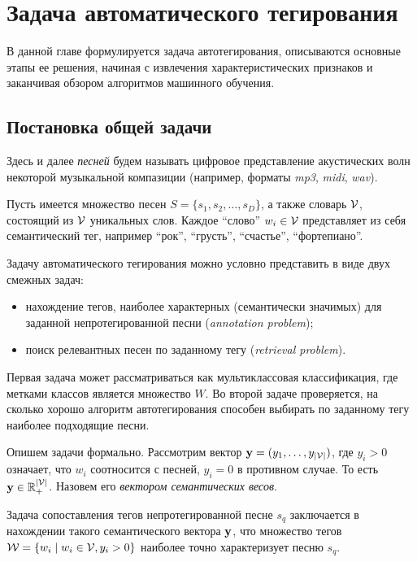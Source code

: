 \chapter{Задача автоматического тегирования}
\label{chapter1}

В данной главе формулируется задача автотегирования, описываются основные этапы ее решения, 
начиная с извлечения характеристических признаков и заканчивая обзором алгоритмов машинного обучения.

\section{Постановка общей задачи}
Здесь и далее \emph{песней} будем называть цифровое представление акустических волн некоторой музыкальной компазиции (например, форматы \emph{mp3}, \emph{midi}, \emph{wav}).

Пусть имеется множество песен $S = \{s_1, s_2, \ldots, s_D \}$, а также словарь $ \mathcal{V} $, состоящий из $ \mathcal{V} $ уникальных слов. 
Каждое ``слово'' $w_i \in \mathcal{V}$ представляет из себя семантический тег, например ``рок'', ``грусть'', ``счастье'', ``фортепиано''.

Задачу автоматического тегирования можно условно представить в виде двух смежных задач: 
\begin{itemize}
 \item нахождение тегов, наиболее характерных (семантически значимых) для заданной непротегированной песни (\emph{annotation problem});
 \item поиск релевантных песен по заданному тегу (\emph{retrieval problem}).
\end{itemize}

Первая задача может рассматриваться как мультиклассовая классификация, где метками классов является множество $W$.
Во второй задаче проверяется, на сколько хорошо алгоритм автотегирования способен выбирать по заданному тегу наиболее подходящие песни.

Опишем задачи формально.
Рассмотрим вектор $\mathbf{y} = (y_1, \ldots, y_{| \mathcal{V} |})$, где $y_i > 0$ означает, что $w_i$ соотносится с песней, $y_i = 0$ в противном случае. То есть $\mathbf{y} \in \mathbb{R}^{|\mathcal{V}|}_{+}$.
Назовем его \emph{вектором семантических весов}.

Задача сопоставления тегов непротегированной песне $s_q$ заключается в нахождении такого семантического вектора $\mathbf{y}$, 
что множество тегов $\mathcal{W} = \{w_i \mid w_i \in \mathcal{V}, y_i > 0\}$ наиболее точно характеризует песню $s_q$.

